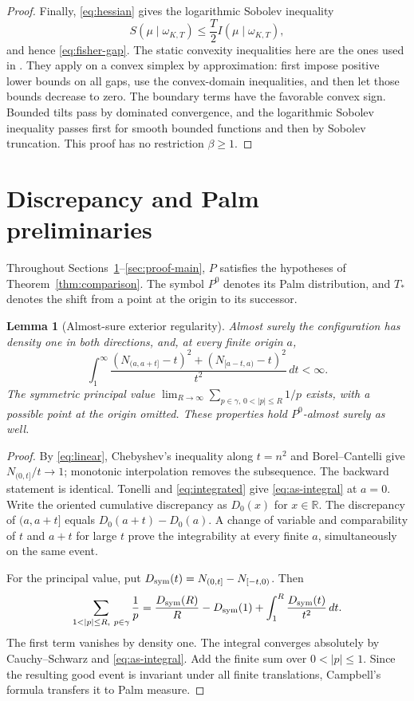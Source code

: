 \documentclass[11pt,reqno]{amsart}
\numberwithin{equation}{section}
\newtheorem{lemma}[theorem]{Lemma}
\theoremstyle{definition}
\theoremstyle{remark}
\newcommand{\R}{\mathbb R}
\newcommand{\1}{\mathbf 1}
\newcommand{\dd}{\,d}
\begin{document}
\begin{proof}
Finally, \eqref{eq:hessian} gives the logarithmic Sobolev inequality
\begin{equation}\label{eq:lsi}
S(\mu\mid\omega_{K,T})\le \frac T2 I(\mu\mid\omega_{K,T}),
\end{equation}
and hence \eqref{eq:fisher-gap}. The static convexity inequalities here
are the ones used in \cite[Sections~3 and 5]{BEY}. They apply on a
convex simplex by approximation: first impose positive lower bounds on
all gaps, use the convex-domain inequalities, and then let those bounds
decrease to zero. The boundary terms have the favorable convex sign.
Bounded tilts pass by dominated convergence, and the logarithmic Sobolev
inequality passes first for smooth bounded functions and then by
Sobolev truncation. This proof has no restriction $\beta\ge1$.
\end{proof}

\section{Discrepancy and Palm preliminaries}\label{sec:palm}

Throughout Sections~\ref{sec:palm}--\ref{sec:proof-main}, $P$ satisfies the
hypotheses of Theorem~\ref{thm:comparison}. The symbol $P^0$ denotes its
Palm distribution, and $T_*$ denotes the shift from a point at the origin
to its successor.

\begin{lemma}[Almost-sure exterior regularity]\label{lem:as-regularity}
Almost surely the configuration has density one in both directions,
and, at every finite origin $a$,
\begin{equation}\label{eq:as-integral}
\int_1^\infty\frac{
  (N_{(a,a+t]}-t)^2+(N_{[a-t,a)}-t)^2}{t^2}\dd t<\infty.
\end{equation}
The symmetric principal value
$\lim_{R\to\infty}\sum_{p\in\gamma,\,0<|p|\le R}1/p$ exists,
with a possible point at the origin omitted.
These properties hold $P^0$-almost surely as well.
\end{lemma}

\begin{proof}
By \eqref{eq:linear}, Chebyshev's inequality along $t=n^2$ and
Borel--Cantelli give $N_{(0,t]}/t\to1$; monotonic interpolation removes
the subsequence. The backward statement is identical.
Tonelli and \eqref{eq:integrated} give \eqref{eq:as-integral} at $a=0$.
Write the oriented cumulative discrepancy as $D_0(x)$ for $x\in\R$.
The discrepancy of $(a,a+t]$ equals $D_0(a+t)-D_0(a)$. A change of
variable and comparability of $t$ and $a+t$ for large $t$ prove the
integrability at every finite $a$, simultaneously on the same event.

For the principal value, put
$D_{\rm sym}(t)=N_{(0,t]}-N_{[-t,0)}$. Then
\[
\sum_{1<|p|\le R,\ p\in\gamma}\frac1p
=\frac{D_{\rm sym}(R)}R-D_{\rm sym}(1)
  +\int_1^R\frac{D_{\rm sym}(t)}{t^2}\dd t.
\]
The first term vanishes by density one. The integral converges
absolutely by Cauchy--Schwarz and \eqref{eq:as-integral}. Add the finite
sum over $0<|p|\le1$. Since the resulting good event is invariant under all finite
translations, Campbell's formula transfers it to Palm measure.
\end{proof}
\end{document}
